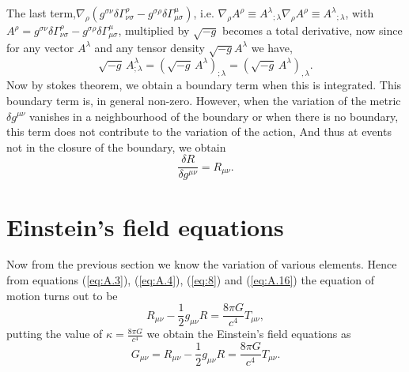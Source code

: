 \documentclass[12pt,a4paper,oneside]{book}
\newcommand{\eq}[2]{\begin{equation} \label{eq:#1} #2 \end{equation}}
\newcommand{\Eref}[1]{(\ref{eq:#1})}
\begin{document}
The last term,$\nabla _{\rho }\left(g^{\sigma \nu }\delta \Gamma _{\nu \sigma }^{\rho }-g^{\sigma \rho }\delta \Gamma _{\mu \sigma }^{\mu }\right)$, i.e. $\nabla _{\rho }A^{\rho }\equiv A^{\lambda }{}_{;\lambda } \nabla _{\rho }A^{\rho }\equiv A^{\lambda }{}_{;\lambda }$, with $ A^{\rho }=g^{\sigma \nu }\delta \Gamma _{\nu \sigma }^{\rho }-g^{\sigma \rho }\delta \Gamma _{\mu \sigma }^{\mu }$,
multiplied by $\sqrt{-g}$ becomes a total derivative, now since for any vector $A^{\lambda}$ and any tensor density $\sqrt{-g}A^{\lambda}$ we have,
\eq{}{ {\sqrt {-g}}\,A_{;\lambda }^{\lambda }=({\sqrt {-g}}\,A^{\lambda })_{;\lambda }=({\sqrt {-g}}\,A^{\lambda })_{,\lambda }.}
Now by stokes theorem, we obtain a boundary term when this is integrated. This boundary term is, in general non-zero. However, when the variation of the metric $\delta g^{\mu\nu}$ vanishes in a neighbourhood of the boundary or when there is no boundary, this term does not contribute to the variation of the action, And thus at events not in the closure of the boundary, we obtain
\eq{A.16}{{\frac {\delta R}{\delta g^{\mu \nu }}}=R_{\mu \nu }.}
 
\section{Einstein's field equations}\label{A_EF_Eq}
Now from the previous section we know the variation of various elements. Hence from equations \Eref{A.3}, \Eref{A.4}, \Eref{8} and \Eref{A.16} the equation of motion turns out to be 
\eq{}{ R_{\mu \nu }-{\frac {1}{2}}g_{\mu \nu }R={\frac {8\pi G}{c^{4}}}T_{\mu \nu },}
putting the value of $\kappa = \frac{8\pi G}{c^4}$ we obtain the Einstein's field equations as
\eq{App_Field_eq}{G_{\mu\nu} = R_{\mu\nu}-\frac{1}{2}g_{\mu\nu}R = \frac{8\pi G}{c^4}T_{\mu\nu}.}

\end{document}
